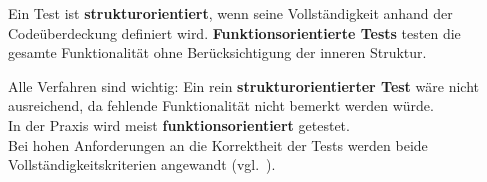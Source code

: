 \vspace{2mm}
\begin{tcolorbox}[title=Strukturorientierte und Funktionsorientierte Tests]
    Ein Test ist \textbf{strukturorientiert}, wenn seine Vollständigkeit anhand der Codeüberdeckung definiert wird.  \textbf{Funktionsorientierte Tests} testen die gesamte Funktionalität ohne Berücksichtigung der inneren Struktur.
\end{tcolorbox}
\vspace{2mm}

\noindent
Alle Verfahren sind wichtig: Ein rein \textbf{strukturorientierter Test} wäre nicht ausreichend, da fehlende Funktionalität nicht bemerkt werden würde.\\
In der Praxis wird meist \textbf{funktionsorientiert} getestet.\\

\noindent
Bei hohen Anforderungen an die Korrektheit der Tests werden beide Vollständigkeitskriterien angewandt (vgl.~\cite[42]{Wed09c}).
